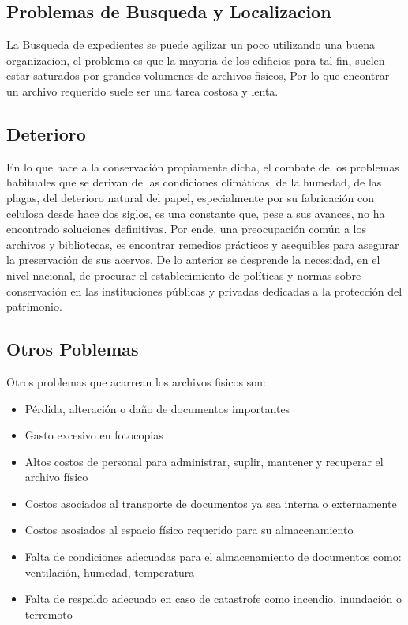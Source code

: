 \subsection{Problemas de Busqueda y Localizacion}
La Busqueda de expedientes se puede agilizar un poco utilizando una buena organizacion,
el problema es que la mayoria de los edificios para tal fin, suelen estar saturados
por grandes volumenes de archivos fisicos, Por lo que encontrar un archivo requerido
suele ser una tarea costosa y lenta.\\[0.1cm]

\subsection{Deterioro}
En lo que hace a la conservación propiamente dicha, el combate de los
problemas habituales que se derivan de las condiciones climáticas, de la humedad,
de las plagas, del deterioro natural del papel, especialmente por su fabricación
con celulosa desde hace dos siglos, es una constante que, pese a sus avances,
no ha encontrado soluciones definitivas. Por ende, una preocupación común a los
archivos y bibliotecas, es encontrar remedios prácticos y asequibles para
asegurar la preservación de sus acervos. De lo anterior se desprende la
necesidad, en el nivel nacional, de procurar el establecimiento de políticas y
normas sobre conservación en las instituciones públicas y privadas dedicadas
a la protección del patrimonio.\\[0.1cm]

\subsection{Otros Poblemas}
Otros problemas que acarrean los archivos fisicos son:

\begin{itemize}
    \item Pérdida, alteración o daño de documentos importantes
    \item Gasto excesivo en fotocopias
    \item Altos costos de personal para administrar, suplir, mantener y recuperar el archivo físico
    \item Costos asociados al transporte de documentos ya sea interna o externamente
    \item Costos asosiados al espacio físico requerido para su almacenamiento
    \item Falta de condiciones adecuadas para el almacenamiento de documentos como: ventilación, humedad, temperatura
    \item Falta de respaldo adecuado en caso de catastrofe como incendio, inundación o terremoto
\end{itemize}


